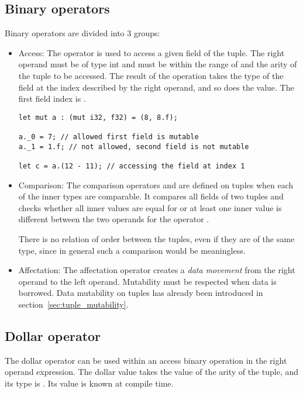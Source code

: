 \subsection {Binary operators}

Binary operators are divided into 3 groups:
\begin{itemize}
\item Access: The operator  is used to access a given field of the
  tuple. The right operand must be of type int and must be within the range of
   and the arity of the tuple to be accessed. The result of the
  operation takes the type of the field at the index described by the right
  operand, and so does the value. The first field index is .

  \begin{lstlisting}[style=coloredverbatim, linewidth=0.95\linewidth]
let mut a : (mut i32, f32) = (8, 8.f);

a._0 = 7; // allowed first field is mutable
a._1 = 1.f; // not allowed, second field is not mutable

let c = a.(12 - 11); // accessing the field at index 1
  \end{lstlisting}

\item Comparison: The comparison operators \token{==} and \token{!=} are
  defined on tuples when each of the inner types are comparable. It compares all
  fields of two tuples and checks whether all inner values are equal for
  \token{==} or at least one inner value is different between the two operands
  for the operator \token{!=}.

  There is no relation of order between the tuples, even if they are of the same
  type, since in general such a comparison would be meaningless.

\item Affectation: The affectation operator creates a \textit{data movement}
  from the right operand to the left operand. Mutability must be respected when
  data is borrowed. Data mutability on tuples has already been introduced in
  section~\ref{sec:tuple_mutability}.

\end{itemize}

\subsection {Dollar operator}

The dollar operator can be used within an access binary operation in the right
operand expression. The dollar value takes the value of the arity of the tuple,
and its type is . Its value is known at compile time.

